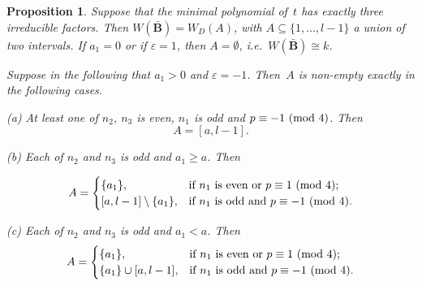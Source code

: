 \documentclass[12pt]{amsart}
\newcommand{\bB}{{\mathbf{B}}}
\newtheorem{prop}[thm]{Proposition}
\theoremstyle{theorem}
\theoremstyle{definition}
\theoremstyle{remark}
\begin{document}
\addtocounter{thm}{1}
\begin{prop}
\label{MainCorCase3}
Suppose that the minimal polynomial of~$t$ has exactly three irreducible 
factors. Then $W( \bar{\bB} ) = W_{D}( A )$, with
$A \subseteq \{ 1, \ldots, l - 1 \}$ a union of two intervals. If $a_1 = 0$ or 
if $\varepsilon = 1$, then $A = \emptyset$, i.e.\ $W( \bar{\bB} ) \cong k$. 

Suppose in the following that $a_1 > 0$ and $\varepsilon = -1$. Then~$A$ is
non-empty exactly in the following cases.

{\rm (a)} At least one of $n_2$, $n_3$ is even, $n_1$ is odd and 
$p \equiv -1\,\,(\mbox{\rm mod}\,\,4)$. Then
$$A = [a, l - 1].$$

{\rm (b)} Each of $n_2$ and $n_3$ is odd and $a_1 \geq a$. Then

$$A = 
\begin{cases}
\{ a_1 \}, & \text{if\ } n_1 \text{\ is even or\ } p \equiv 1\,\,(\mbox{\rm mod}\,\,4); \\
[a, l - 1] \setminus \{ a_1 \}, & 
\text{if\ } n_1 \text{\ is odd and\ } p \equiv -1\,\,(\mbox{\rm mod}\,\,4).
\end{cases}
$$

{\rm (c)} Each of $n_2$ and $n_3$ is odd and $a_1 < a$. Then
$$A = 
\begin{cases}
\{ a_1 \}, & \text{if\ } n_1 \text{\ is even or\ } p \equiv 1\,\,(\mbox{\rm mod}\,\,4); \\
\{ a_1 \} \cup [a, l - 1], & \text{if\ } n_1 \text{\ is odd and\ } p \equiv -1\,\,(\mbox{\rm mod}\,\,4).
\end{cases}
$$
\end{prop}
\end{document}
